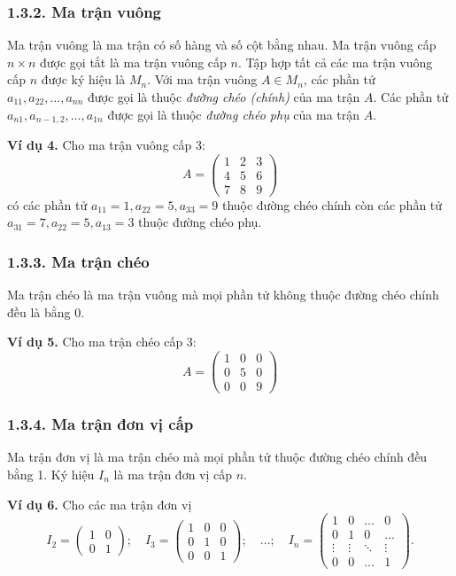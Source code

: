 \subsubsection*{1.3.2. Ma trận vuông}
Ma trận vuông là ma trận có số hàng và số cột bằng nhau. Ma trận vuông cấp \( n \times n \) được gọi tắt là ma trận vuông cấp \( n \). Tập hợp tất cả các ma trận vuông cấp \( n \) được ký hiệu là \( M_n \). Với ma trận vuông \( A \in M_n \), các phần tử \( a_{11}, a_{22}, \ldots, a_{nn} \) được gọi là thuộc \textit{đường chéo (chính)} của ma trận \( A \). Các phần tử \( a_{n1}, a_{n-1,2}, \ldots, a_{1n} \) được gọi là thuộc \textit{đường chéo phụ} của ma trận \( A \).

\textbf{Ví dụ 4.} Cho ma trận vuông cấp 3:
\[
A = \begin{pmatrix}
1 & 2 & 3 \\
4 & 5 & 6 \\
7 & 8 & 9
\end{pmatrix}
\]
có các phần tử \( a_{11} = 1, a_{22} = 5, a_{33} = 9 \) thuộc đường chéo chính còn các phần tử \( a_{31} = 7, a_{22} = 5, a_{13} = 3 \) thuộc đường chéo phụ.

\subsubsection*{1.3.3. Ma trận chéo}
Ma trận chéo là ma trận vuông mà mọi phần tử không thuộc đường chéo chính đều là bằng 0.

\textbf{Ví dụ 5.} Cho ma trận chéo cấp 3:
\[
A = \begin{pmatrix}
1 & 0 & 0 \\
0 & 5 & 0 \\
0 & 0 & 9
\end{pmatrix}
\]
\subsubsection*{1.3.4. Ma trận đơn vị cấp}
Ma trận đơn vị là ma trận chéo mà mọi phần tử thuộc đường chéo chính đều bằng 1. Ký hiệu \( I_n \) là ma trận đơn vị cấp \( n \).

\textbf{Ví dụ 6.} Cho các ma trận đơn vị
\[
I_2 = \begin{pmatrix}
1 & 0 \\
0 & 1
\end{pmatrix}
; \quad
I_3 = \begin{pmatrix}
1 & 0 & 0 \\
0 & 1 & 0 \\
0 & 0 & 1
\end{pmatrix}
; \quad \ldots; \quad
I_n = \begin{pmatrix}
1 & 0 & \ldots & 0 \\
0 & 1 & 0 & \ldots \\
\vdots & \vdots & \ddots & \vdots \\
0 & 0 & \ldots & 1
\end{pmatrix}
.
\]

